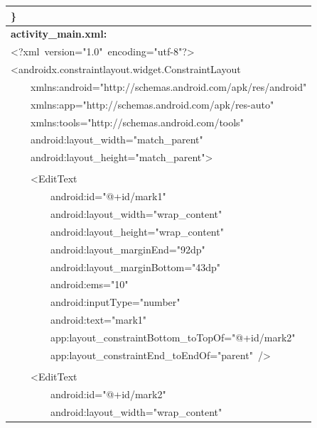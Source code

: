 \documentclass[a4paper,12pt]{article}
\begin{document}
\begin{longtable}{|p{}|}
{\ttfamily\small \}} \\
\hline
\rule{0pt}{13pt}\textbf{activity\_main.xml:} \\
\hline
{\ttfamily\small \textless{}?xml\ version="1.0"\ encoding="utf-8"?\textgreater{}} \\
{\ttfamily\small \textless{}androidx.constraintlayout.widget.ConstraintLayout} \\
{\ttfamily\small \ \ \ \ xmlns:android="http://schemas.android.com/apk/res/android"} \\
{\ttfamily\small \ \ \ \ xmlns:app="http://schemas.android.com/apk/res-auto"} \\
{\ttfamily\small \ \ \ \ xmlns:tools="http://schemas.android.com/tools"} \\
{\ttfamily\small \ \ \ \ android:layout\_width="match\_parent"} \\
{\ttfamily\small \ \ \ \ android:layout\_height="match\_parent"\textgreater{}} \\
\strut \\
{\ttfamily\small \ \ \ \ \textless{}EditText} \\
{\ttfamily\small \ \ \ \ \ \ \ \ android:id="@+id/mark1"} \\
{\ttfamily\small \ \ \ \ \ \ \ \ android:layout\_width="wrap\_content"} \\
{\ttfamily\small \ \ \ \ \ \ \ \ android:layout\_height="wrap\_content"} \\
{\ttfamily\small \ \ \ \ \ \ \ \ android:layout\_marginEnd="92dp"} \\
{\ttfamily\small \ \ \ \ \ \ \ \ android:layout\_marginBottom="43dp"} \\
{\ttfamily\small \ \ \ \ \ \ \ \ android:ems="10"} \\
{\ttfamily\small \ \ \ \ \ \ \ \ android:inputType="number"} \\
{\ttfamily\small \ \ \ \ \ \ \ \ android:text="mark1"} \\
{\ttfamily\small \ \ \ \ \ \ \ \ app:layout\_constraintBottom\_toTopOf="@+id/mark2"} \\
{\ttfamily\small \ \ \ \ \ \ \ \ app:layout\_constraintEnd\_toEndOf="parent"\ /\textgreater{}} \\
\strut \\
{\ttfamily\small \ \ \ \ \textless{}EditText} \\
{\ttfamily\small \ \ \ \ \ \ \ \ android:id="@+id/mark2"} \\
{\ttfamily\small \ \ \ \ \ \ \ \ android:layout\_width="wrap\_content"} \\

\end{longtable}
\end{document}
